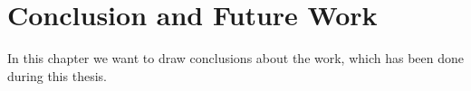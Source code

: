 %
% 


\chapter{Conclusion and Future Work}
\label{sec:conclusion_and_future_work}

In this chapter we want to draw conclusions about the work, which has been done
during this thesis. \blindtext

